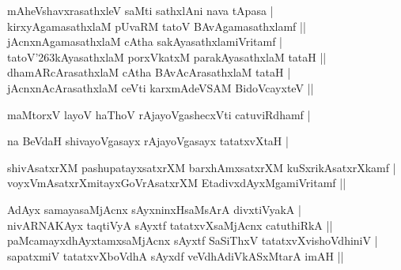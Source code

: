 \begin{entry}
\begin{shl}
mAheVshavxrasathxleV saMti sathxlAni nava tApasa |\\
kirxyAgamasathxlaM pUvaRM tatoV BAvAgamasathxlamf ||\\
jAcnxnAgamasathxlaM cAtha sakAyasathxlamiVritamf |\\
tatoV{\char'263}kAyasathxlaM porxVkatxM parakAyasathxlaM tataH ||\\
dhamARcArasathxlaM cAtha BAvAcArasathxlaM tataH |\\
jAcnxnAcArasathxlaM ceVti karxmAdeVSAM BidoVcayxteV ||
\end{shl}
\medskip
{}
\smallskip
\begin{shl}
maMtorxV layoV haThoV rAjayoVgashecxVti catuviRdhamf |
\end{shl}
\medskip
{}
\smallskip
\begin{shl}
na BeVdaH shivayoVgasayx rAjayoVgasayx tatatxvXtaH |
\end{shl}
\medskip
{}
\smallskip
\begin{shl}
shivAsatxrXM pashupatayxsatxrXM barxhAmxsatxrXM kuSxrikAsatxrXkamf |\\
voyxVmAsatxrXmitayxGoVrAsatxrXM EtadivxdAyxMgamiVritamf ||
\end{shl}
\medskip
{}
\smallskip
\begin{shl}
AdAyx samayasaMjAcnx sAyxninxHsaMsArA divxtiVyakA |\\
nivARNAKAyx taqtiVyA sAyxtf tatatxvXsaMjAcnx catuthiRkA ||\\
paMcamayxdhAyxtamxsaMjAcnx sAyxtf SaSiThxV tatatxvXvishoVdhiniV |\\
sapatxmiV tatatxvXboVdhA sAyxdf veVdhAdiVkASxMtarA imAH ||
\end{shl}
\medskip
{}

\end{entry}
